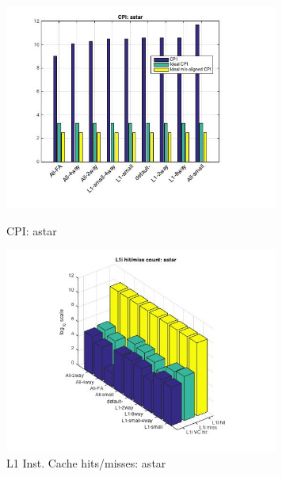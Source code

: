 \documentclass[11pt,titlepage]{article}
\begin{document}
	 \begin{figure}[H]
          \centering
          \begin{minipage}{.5\textwidth}
            \centering
            \includegraphics[width=9cm]{CPIastar}
            \caption{CPI: astar}
            \label{fig:CPIastar}
          \end{minipage}%
          \begin{minipage}{.5\textwidth}
            \includegraphics[width=9cm]{L1IHM_astar}
            \caption{L1 Inst. Cache hits/misses: astar}
            \label{fig:L1IHM_astar}
          \end{minipage}%
	\end{figure}
\end{document}
